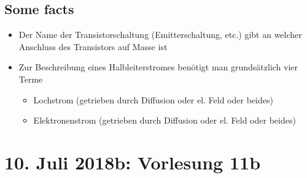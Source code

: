 \documentclass[12pt,a4paper]{report}%
\numberwithin{equation}{section}
\numberwithin{equation}{subsection}
\begin{document}
  \subsection{Some facts}
  \begin{itemize}
    \item Der Name der Transistorschaltung (Emitterschaltung, etc.) gibt an welcher Anschluss des Transistors auf Masse ist
    \item Zur Beschreibung eines Halbleiterstromes benötigt man grundsätzlich vier Terme
      \begin{itemize}
        \item Lochstrom (getrieben durch Diffusion oder el. Feld oder beides)
        \item Elektronenstrom (getrieben durch Diffusion oder el. Feld oder beides)
      \end{itemize}
  \end{itemize}
\newpage	

  \section{10. Juli 2018b: Vorlesung 11b}
\end{document}
